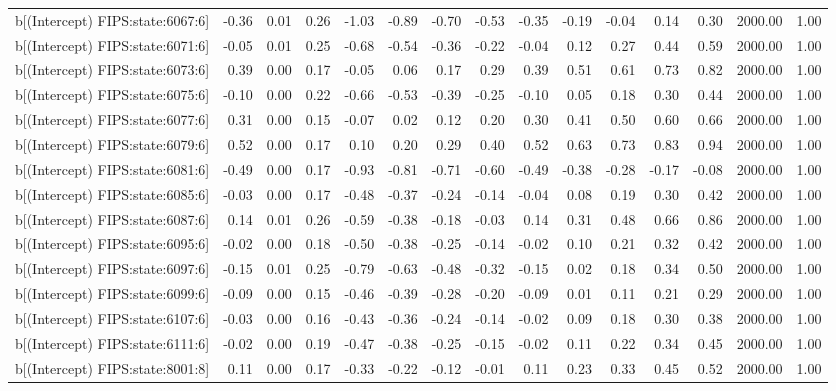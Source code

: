 \begin{table}[ht]
\begin{tabular}{rrrrrrrrrrrrrrr}
  b[(Intercept) FIPS:state:6067:6] & -0.36 & 0.01 & 0.26 & -1.03 & -0.89 & -0.70 & -0.53 & -0.35 & -0.19 & -0.04 & 0.14 & 0.30 & 2000.00 & 1.00 \\ 
  b[(Intercept) FIPS:state:6071:6] & -0.05 & 0.01 & 0.25 & -0.68 & -0.54 & -0.36 & -0.22 & -0.04 & 0.12 & 0.27 & 0.44 & 0.59 & 2000.00 & 1.00 \\ 
  b[(Intercept) FIPS:state:6073:6] & 0.39 & 0.00 & 0.17 & -0.05 & 0.06 & 0.17 & 0.29 & 0.39 & 0.51 & 0.61 & 0.73 & 0.82 & 2000.00 & 1.00 \\ 
  b[(Intercept) FIPS:state:6075:6] & -0.10 & 0.00 & 0.22 & -0.66 & -0.53 & -0.39 & -0.25 & -0.10 & 0.05 & 0.18 & 0.30 & 0.44 & 2000.00 & 1.00 \\ 
  b[(Intercept) FIPS:state:6077:6] & 0.31 & 0.00 & 0.15 & -0.07 & 0.02 & 0.12 & 0.20 & 0.30 & 0.41 & 0.50 & 0.60 & 0.66 & 2000.00 & 1.00 \\ 
  b[(Intercept) FIPS:state:6079:6] & 0.52 & 0.00 & 0.17 & 0.10 & 0.20 & 0.29 & 0.40 & 0.52 & 0.63 & 0.73 & 0.83 & 0.94 & 2000.00 & 1.00 \\ 
  b[(Intercept) FIPS:state:6081:6] & -0.49 & 0.00 & 0.17 & -0.93 & -0.81 & -0.71 & -0.60 & -0.49 & -0.38 & -0.28 & -0.17 & -0.08 & 2000.00 & 1.00 \\ 
  b[(Intercept) FIPS:state:6085:6] & -0.03 & 0.00 & 0.17 & -0.48 & -0.37 & -0.24 & -0.14 & -0.04 & 0.08 & 0.19 & 0.30 & 0.42 & 2000.00 & 1.00 \\ 
  b[(Intercept) FIPS:state:6087:6] & 0.14 & 0.01 & 0.26 & -0.59 & -0.38 & -0.18 & -0.03 & 0.14 & 0.31 & 0.48 & 0.66 & 0.86 & 2000.00 & 1.00 \\ 
  b[(Intercept) FIPS:state:6095:6] & -0.02 & 0.00 & 0.18 & -0.50 & -0.38 & -0.25 & -0.14 & -0.02 & 0.10 & 0.21 & 0.32 & 0.42 & 2000.00 & 1.00 \\ 
  b[(Intercept) FIPS:state:6097:6] & -0.15 & 0.01 & 0.25 & -0.79 & -0.63 & -0.48 & -0.32 & -0.15 & 0.02 & 0.18 & 0.34 & 0.50 & 2000.00 & 1.00 \\ 
  b[(Intercept) FIPS:state:6099:6] & -0.09 & 0.00 & 0.15 & -0.46 & -0.39 & -0.28 & -0.20 & -0.09 & 0.01 & 0.11 & 0.21 & 0.29 & 2000.00 & 1.00 \\ 
  b[(Intercept) FIPS:state:6107:6] & -0.03 & 0.00 & 0.16 & -0.43 & -0.36 & -0.24 & -0.14 & -0.02 & 0.09 & 0.18 & 0.30 & 0.38 & 2000.00 & 1.00 \\ 
  b[(Intercept) FIPS:state:6111:6] & -0.02 & 0.00 & 0.19 & -0.47 & -0.38 & -0.25 & -0.15 & -0.02 & 0.11 & 0.22 & 0.34 & 0.45 & 2000.00 & 1.00 \\ 
  b[(Intercept) FIPS:state:8001:8] & 0.11 & 0.00 & 0.17 & -0.33 & -0.22 & -0.12 & -0.01 & 0.11 & 0.23 & 0.33 & 0.45 & 0.52 & 2000.00 & 1.00 \\ 

\end{tabular}
\end{table}
